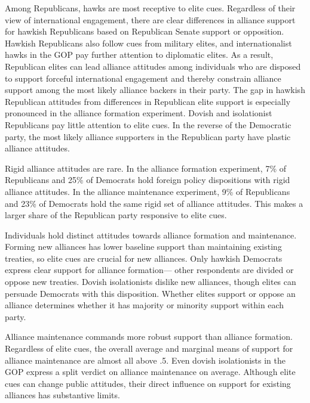 \documentclass[12pt]{article}
\begin{document}
Among Republicans, hawks are most receptive to elite cues. 
Regardless of their view of international engagement, there are clear differences in alliance support for hawkish Republicans based on Republican Senate support or opposition.
Hawkish Republicans also follow cues from military elites, and internationalist hawks in the GOP pay further attention to diplomatic elites. 
As a result, Republican elites can lead alliance attitudes among individuals who are disposed to support forceful international engagement and thereby constrain alliance support among the most likely alliance backers in their party. 
The gap in hawkish Republican attitudes from differences in Republican elite support is especially pronounced in the alliance formation experiment. 
Dovish and isolationist Republicans pay little attention to elite cues. 
In the reverse of the Democratic party, the most likely alliance supporters in the Republican party have plastic alliance attitudes. 


Rigid alliance attitudes are rare. 
In the alliance formation experiment, 7\% of Republicans and 25\% of Democrats hold foreign policy dispositions with rigid alliance attitudes. 
In the alliance maintenance experiment, 9\% of Republicans and 23\% of Democrats hold the same rigid set of alliance attitudes.
This makes a larger share of the Republican party responsive to elite cues.



Individuals hold distinct attitudes towards alliance formation and maintenance. 
Forming new alliances has lower baseline support than maintaining existing treaties, so elite cues are crucial for new alliances. 
Only hawkish Democrats express clear support for alliance formation--- other respondents are divided or oppose new treaties.
Dovish isolationists dislike new alliances, though elites can persuade Democrats with this disposition. 
Whether elites support or oppose an alliance determines whether it has majority or minority support within each party. 


Alliance maintenance commands more robust support than alliance formation. 
Regardless of elite cues, the overall average and marginal means of support for alliance maintenance are almost all above .5. 
Even dovish isolationists in the GOP express a split verdict on alliance maintenance on average.
Although elite cues can change public attitudes, their direct influence on support for existing alliances has substantive limits.
\end{document}
